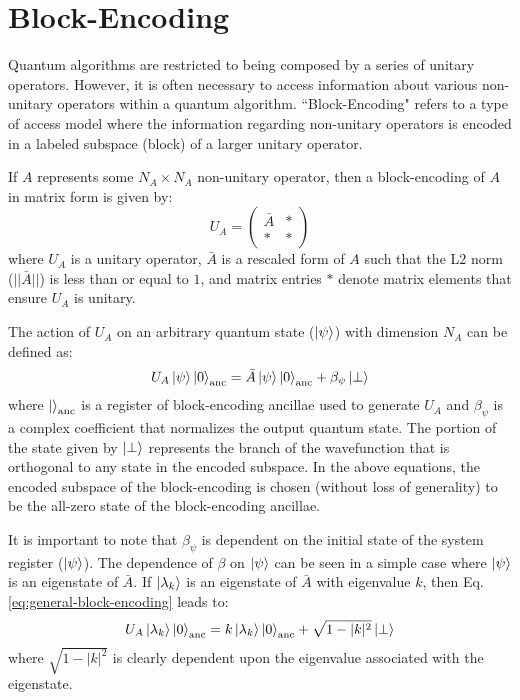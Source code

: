 \section{Block-Encoding}
\label{sec:block-encoding}

Quantum algorithms are restricted to being composed by a series of unitary operators.
However, it is often necessary to access information about various non-unitary operators within a quantum algorithm.
``Block-Encoding" refers to a type of access model where the information regarding non-unitary operators is encoded in a labeled subspace (block) of a larger unitary operator.

If $A$ represents some $N_A \times N_A$ non-unitary operator, then a block-encoding of $A$ in matrix form is given by:
\begin{equation}
    U_A = 
    \begin{pmatrix}
    \bar{A} & * \\
    * & * 
    \end{pmatrix}
\end{equation}
where $U_A$ is a unitary operator, $\bar{A}$ is a rescaled form of $A$ such that the L2 norm ($||\bar{A}||$) is less than or equal to $1$, and matrix entries $*$ denote matrix elements that ensure $U_A$ is unitary.

The action of $U_A$ on an arbitrary quantum state ($\ket{\psi}$) with dimension $N_A$ can be defined as:
\begin{equation}
    \label{eq:general-block-encoding}
    U_A \ket{\psi} \ket{0}_{\text{anc}} = \bar{A} \ket{\psi} \ket{0}_{\text{anc}} + \beta_\psi \ket{\perp}
\end{equation}
where $\ket{}_{\text{anc}}$ is a register of block-encoding ancillae used to generate $U_A$ and $\beta_\psi$ is a complex coefficient that normalizes the output quantum state.
The portion of the state given by $\ket{\perp}$ represents the branch of the wavefunction that is orthogonal to any state in the encoded subspace.
In the above equations, the encoded subspace of the block-encoding is chosen (without loss of generality) to be the all-zero state of the block-encoding ancillae.

It is important to note that $\beta_\psi$ is dependent on the initial state of the system register ($\ket{\psi}$).
The dependence of $\beta$ on $\ket{\psi}$ can be seen in a simple case where $\ket{\psi}$ is an eigenstate of $\bar{A}$.
If $\ket{\lambda_k}$ is an eigenstate of $\bar{A}$ with eigenvalue $k$, then Eq. \ref{eq:general-block-encoding} leads to:
\begin{equation}
    U_A \ket{\lambda_k} \ket{0}_{\text{anc}} = k \ket{\lambda_k} \ket{0}_{\text{anc}} + \sqrt{1 - |k|^2} \ket{\perp}
\end{equation}
where $\sqrt{1 - |k|^2}$ is clearly dependent upon the eigenvalue associated with the eigenstate.

